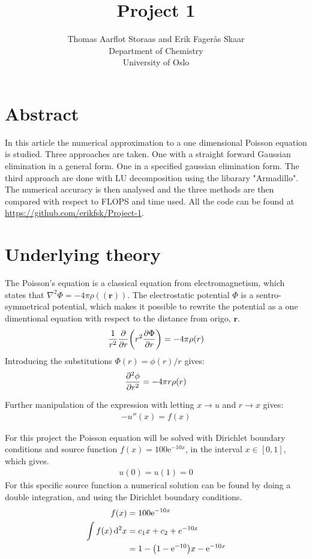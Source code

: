 \documentclass[12pt,norsk,a4paper]{article}
\renewcommand{\exp}[1]{\mathrm{e}^{#1}}
\begin{document}
\author{Thomas Aarflot Storaas and Erik Fagerås Skaar\\
	Department of Chemistry\\
	University of Oslo\\	
}

\title{Project 1}
\maketitle

\section{Abstract}
In this article the numerical approximation to a one dimensional Poisson equation is studied. Three approaches are taken. One with a straight forward Gaussian elimination in a general form. One in a specified gaussian elimination form. The third approach are done with LU decomposition using the libarary "Armadillo". The numerical accuracy is then analysed and the three methods are then compared with respect to FLOPS and time used. All the code can be found at \href{https://github.com/erikfsk/Project-1}{https://github.com/erikfsk/Project-1}. %


\section{Underlying theory}

The Poisson's equation is a classical equation from electromagnetism, which states that $\nabla^2\Phi=-4\pi\rho(\mathbf{(r)})$. The electrostatic potential $\Phi$ is a sentro- symmetrical potential, which makes it possible to rewrite the potential as a one dimentional equation with respect to the distance from origo, $\mathbf{r}$.
\begin{align*}
	\frac{1}{r^2}\pdv{r}\qty(r^2 \pdv{\Phi}{r})=-4\pi\rho(r)
\end{align*}
Introducing the substitutions $\Phi(r)=\phi(r)/r$ gives:
\begin{align}
	\pdv[2]{\phi}{r}=-4\pi r \rho(r)
\end{align}

Further manipulation of the expression with letting $x\to  u$ and $r\to x$ gives:
\begin{align*}
	-u''(x)=f(x)
\end{align*}

For this project the Poisson equation will be solved with Dirichlet boundary conditions and source function $f(x)=100\exp{-10x}$, in the interval $x\in[0,1]$, which gives.
\begin{align}
	u(0)=u(1)=0
\end{align}\label{2}
For this specific source function a numerical solution can be found by doing a double integration, and using the Dirichlet boundary conditions. 
\begin{align*}
	f(x)&=100\exp{-10x}\\
	\int f(x)\dd[2]{x}&=c_1x+c_2 + e^{-10 x}\\
	&=1-\qty(1-\exp{-10})x-\exp{-10x}
\end{align*}
\end{document}
